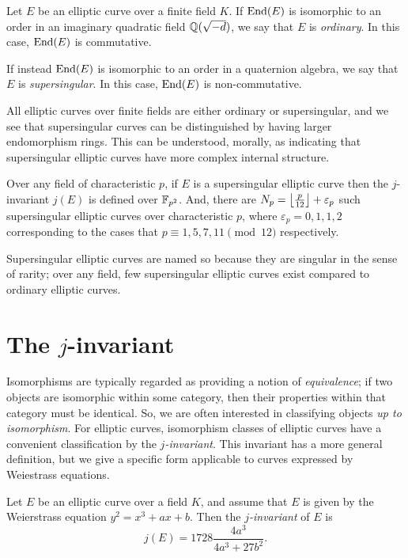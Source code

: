         \begin{definition}
            Let $E$ be an elliptic curve over a finite field $K$. If $\mathrm{End}(E)$ is isomorphic to an order in an imaginary quadratic field $\mathbb{Q}(\sqrt{-d})$, we say that $E$ is \textit{ordinary}. In this case, $\mathrm{End}(E)$ is commutative.

            If instead $\mathrm{End}(E)$ is isomorphic to an order in a quaternion algebra, we say that $E$ is \textit{supersingular}. In this case, $\mathrm{End}(E)$ is non-commutative.
        \end{definition}

        All elliptic curves over finite fields are either ordinary or supersingular, and we see that supersingular curves can be distinguished by having larger endomorphism rings. This can be understood, morally, as indicating that supersingular elliptic curves have more complex internal structure.

        \begin{property}
            Over any field of characteristic $p$, if $E$ is a supersingular elliptic curve then the $j$-invariant $j(E)$ is defined over $\mathbb{F}_{p^2}$. And, there are $N_p = \left\lfloor\frac{p}{12}\right\rfloor + \varepsilon_p$ such supersingular elliptic curves over characteristic $p$, where $\varepsilon_p = 0,1,1,2$ corresponding to the cases that $p \equiv 1,5,7,11 \pmod{12}$ respectively.
        \end{property}

        Supersingular elliptic curves are named so because they are singular in the sense of rarity; over any field, few supersingular elliptic curves exist compared to ordinary elliptic curves.

    \section{The \texorpdfstring{$j$}{j}-invariant}
        Isomorphisms are typically regarded as providing a notion of \textit{equivalence}; if two objects are isomorphic within some category, then their properties within that category must be identical. So, we are often interested in classifying objects \textit{up to isomorphism}. For elliptic curves, isomorphism classes of elliptic curves have a convenient classification by the \textit{$j$-invariant}. This invariant has a more general definition, but we give a specific form applicable to curves expressed by Weiestrass equations.

        \begin{definition}[$j$-invariant]
            Let $E$ be an elliptic curve over a field $K$, and assume that $E$ is given by the Weierstrass equation $y^2 = x^3 + ax + b$. Then the \textit{$j$-invariant} of $E$ is
            \begin{equation*}
                j(E) = 1728\frac{4a^3}{4a^3 + 27b^2}.
            \end{equation*}
        \end{definition}

